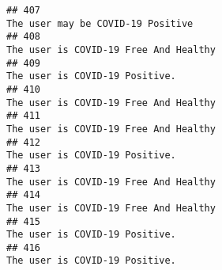 \documentclass[
]{article}
\begin{document}
\begin{verbatim}
## 407                                                                                                                                                                                                                                  The user may be COVID-19 Positive
## 408                                                                                                                                                                                                                              The user is COVID-19 Free And Healthy
## 409                                                                                                                                                                                                                                     The user is COVID-19 Positive.
## 410                                                                                                                                                                                                                              The user is COVID-19 Free And Healthy
## 411                                                                                                                                                                                                                              The user is COVID-19 Free And Healthy
## 412                                                                                                                                                                                                                                     The user is COVID-19 Positive.
## 413                                                                                                                                                                                                                              The user is COVID-19 Free And Healthy
## 414                                                                                                                                                                                                                              The user is COVID-19 Free And Healthy
## 415                                                                                                                                                                                                                                     The user is COVID-19 Positive.
## 416                                                                                                                                                                                                                                     The user is COVID-19 Positive.

\end{verbatim}
\end{document}
